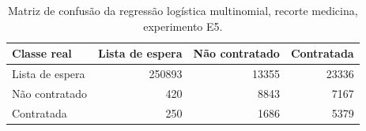 \begin{table}
\caption{Matriz de confusão da regressão logística multinomial, recorte medicina, experimento E5.}
\label{tab:matriz_confusao_logit_ternario_recorte_medicina_in_sample_e5}
\begin{tabular}{lrrr}
\toprule
Classe real & Lista de espera & Não contratado & Contratada \\
\midrule
Lista de espera & 250893 & 13355 & 23336 \\
Não contratado & 420 & 8843 & 7167 \\
Contratada & 250 & 1686 & 5379 \\
\bottomrule
\end{tabular}
\end{table}
